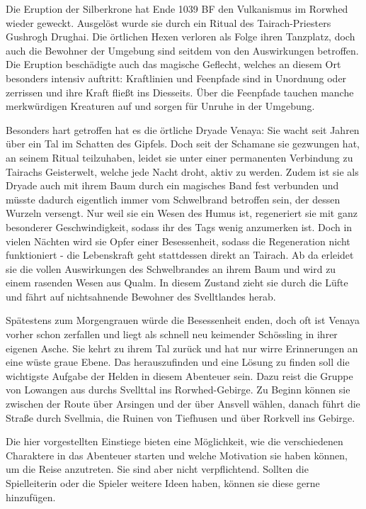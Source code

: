 
\spaltenanfang



Die Eruption der Silberkrone hat Ende 1039 BF den Vulkanismus im Rorwhed wieder geweckt. Ausgelöst wurde sie durch ein Ritual des Tairach-Priesters Gushrogh Drughai. Die örtlichen Hexen verloren als Folge ihren Tanzplatz, doch auch die Bewohner der Umgebung sind seitdem von den Auswirkungen betroffen. Die Eruption beschädigte auch das magische Geflecht, welches an diesem Ort besonders intensiv auftritt: Kraftlinien und Feenpfade sind in Unordnung oder zerrissen und ihre Kraft fließt ins Diesseits. Über die Feenpfade tauchen manche merkwürdigen Kreaturen auf und sorgen für Unruhe in der Umgebung.


Besonders hart getroffen hat es die örtliche Dryade Venaya: Sie wacht seit Jahren über ein Tal im Schatten des Gipfels. Doch seit der Schamane sie gezwungen hat, an seinem Ritual teilzuhaben, leidet sie unter einer permanenten Verbindung zu Tairachs Geisterwelt, welche jede Nacht droht, aktiv zu werden. Zudem ist sie als Dryade auch mit ihrem Baum durch ein magisches Band fest verbunden und müsste dadurch eigentlich immer vom Schwelbrand betroffen sein, der dessen Wurzeln versengt. Nur weil sie ein Wesen des Humus ist, regeneriert sie mit ganz besonderer Geschwindigkeit, sodass ihr des Tags wenig anzumerken ist. Doch in vielen Nächten wird sie Opfer einer Besessenheit, sodass die Regeneration nicht funktioniert - die Lebenskraft geht stattdessen direkt an Tairach. Ab da erleidet sie die vollen Auswirkungen des Schwelbrandes an ihrem Baum und wird zu einem rasenden Wesen aus Qualm. In diesem Zustand zieht sie durch die Lüfte und fährt auf nichtsahnende Bewohner des Svelltlandes herab.


Spätestens zum Morgengrauen würde die Besessenheit enden, doch oft ist Venaya vorher schon zerfallen und liegt als schnell neu keimender Schössling in ihrer eigenen Asche. Sie kehrt zu ihrem Tal zurück und hat nur wirre Erinnerungen an eine wüste graue Ebene. Das herauszufinden und eine Lösung zu finden soll die wichtigste Aufgabe der Helden in diesem Abenteuer sein.
Dazu reist die Gruppe von Lowangen aus durchs Svellttal ins Rorwhed-Gebirge. Zu Beginn können sie zwischen der Route über Arsingen und der über Ansvell wählen, danach führt die Straße durch Svellmia, die Ruinen von Tiefhusen und über Rorkvell ins Gebirge.


Die hier vorgestellten Einstiege bieten eine Möglichkeit, wie die verschiedenen Charaktere in das Abenteuer starten und welche Motivation sie haben können, um die Reise anzutreten. Sie sind aber nicht verpflichtend. Sollten die Spielleiterin oder die Spieler weitere Ideen haben, können sie diese gerne hinzufügen.


